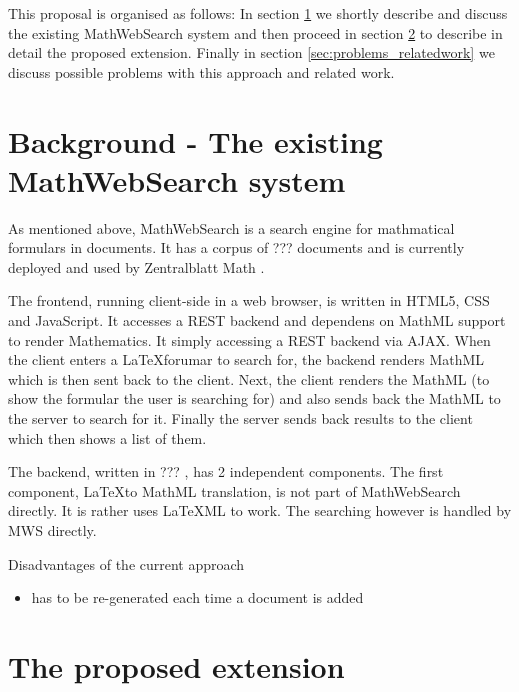 \documentclass[11pt]{article}
\begin{document}
This proposal is organised as follows: In section \ref{sec:mws} we shortly describe and discuss the existing MathWebSearch system and then proceed in section \ref{sec:extension} to describe in detail the proposed extension. Finally in section \ref{sec:problems_relatedwork} we discuss possible problems with this approach and related work.

\section{Background - The existing MathWebSearch system}
\label{sec:mws}

As mentioned above, MathWebSearch is a search engine for mathmatical formulars in documents. It has a corpus of ??? documents  and is currently deployed and used by Zentralblatt Math .

The frontend, running client-side in a web browser, is written in HTML5, CSS and JavaScript. It accesses a REST backend and dependens on MathML support to render Mathematics. It simply accessing a REST backend via AJAX. When the client enters a \LaTeX forumar to search for, the backend renders MathML which is then sent back to the client. Next, the client renders the MathML (to show the formular the user is searching for) and also sends back the MathML to the server to search for it. Finally the server sends back results to the client which then shows a list of them.

The backend, written in ??? , has 2 independent components. The first component, \LaTeX to MathML translation, is not part of MathWebSearch directly. It is rather uses \LaTeX ML to work. The searching however is handled by MWS directly.



Disadvantages of the current approach
\begin{itemize}
  \item has to be re-generated each time a document is added
\end{itemize}

\section{The proposed extension}
\label{sec:extension}
\end{document}
